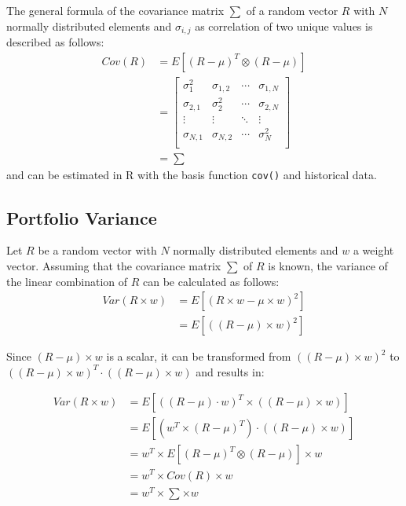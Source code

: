 \documentclass[
  oneside]{book}
\begin{document}
The general formula of the covariance matrix \(\textstyle\sum\) of a random vector \(R\) with \(N\) normally distributed elements and \(\sigma_{i,j}\) as correlation of two unique values is described as follows:
\begin{align*}
  Cov(R) &= E[(R-\mu)^T \otimes (R-\mu)] \\
  &=   \begin{bmatrix}
    \sigma_1^2 & \sigma_{1,2} & \cdots & \sigma_{1,N} \\
    \sigma_{2, 1} & \sigma_2^2 & \cdots & \sigma_{2, N} \\
    \vdots  & \vdots & \ddots & \vdots \\
    \sigma_{N, 1} & \sigma_{N, 2} & \cdots & \sigma_N^2 \\
 \end{bmatrix}\\
  &=\textstyle\sum
\end{align*}
and can be estimated in R with the basis function \texttt{cov()} and historical data.

\hypertarget{portvar}{%
\subsection{Portfolio Variance}\label{portvar}}

Let \(R\) be a random vector with \(N\) normally distributed elements and \(w\) a weight vector. Assuming that the covariance matrix \(\sum\) of \(R\) is known, the variance of the linear combination of \(R\) can be calculated as follows:
\begin{align*}
  Var(R \times w) &= E[(R \times w - \mu \times w)^2] \\
  &= E[((R - \mu) \times w)^2]
\end{align*}

Since \((R - \mu) \times w\) is a scalar, it can be transformed from \(((R - \mu) \times w)^2\) to \(((R - \mu) \times w)^T \cdot ((R - \mu) \times w)\) and results in:

\begin{align*}
  Var(R \times w) &= E[((R - \mu) \cdot w)^T \times ((R - \mu) \times w)]\\ 
  &= E[(w^T \times (R - \mu)^T) \cdot ((R - \mu) \times w)]\\ 
  &= w^T \times E[(R - \mu)^T \otimes (R - \mu)] \times w \\
  &= w^T \times Cov(R) \times w \\
  &= w^T \times \textstyle\sum \times w
\end{align*}
\end{document}
